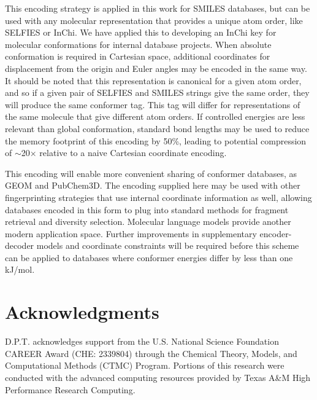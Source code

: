 \documentclass[%
 preprint,
superscriptaddress,
 amsmath,amssymb,
 aip,
 jcp,
]{revtex4-2}
\begin{document}
This encoding strategy is applied in this work for SMILES databases, but can be used with any molecular representation that provides a unique atom order, like SELFIES or InChi.
We have applied this to developing an InChi key for molecular conformations for internal database projects.
When absolute conformation is required in Cartesian space, additional coordinates for displacement from the origin and Euler angles may be encoded in the same way.
It should be noted that this representation is canonical for a given atom order, and so if a given pair of SELFIES and SMILES strings give the same order, they will produce the same conformer tag.
This tag will differ for representations of the same molecule that give different atom orders.
If controlled energies are less relevant than global conformation, standard bond lengths may be used to reduce the memory footprint of this encoding by 50\%, leading to potential compression of $\sim$20$\times$ relative to a naive Cartesian coordinate encoding.

This encoding will enable more convenient sharing of conformer databases, as GEOM and PubChem3D.\cite{GEOM,Bolton2011:PubChem3D}
The encoding supplied here may be used with other fingerprinting strategies that use internal coordinate information as well, allowing databases encoded in this form to plug into standard methods for fragment retrieval and diversity selection.\cite{SchulzGasch2012:TFD,Axen2017:3d-fingerprint,Schreyer2012:USRCAT,Quintana2022:md-fingerprints}
Molecular language models provide another modern application space.\cite{Li2025Geo2Seq,Wang2025TokenMol}
Further improvements in supplementary encoder-decoder models and coordinate constraints will be required before this scheme can be applied to databases where conformer energies differ by less than one kJ/mol.\cite{Roe2022:compression-energy,Eastman2023:SPICE}

\section{Acknowledgments}
D.P.T. acknowledges support from the U.S. National Science Foundation CAREER Award (CHE: 2339804) through the Chemical Theory, Models, and Computational Methods (CTMC) Program. Portions of this research were conducted with the advanced computing resources provided by Texas A\&M High Performance Research Computing. 
\end{document}

